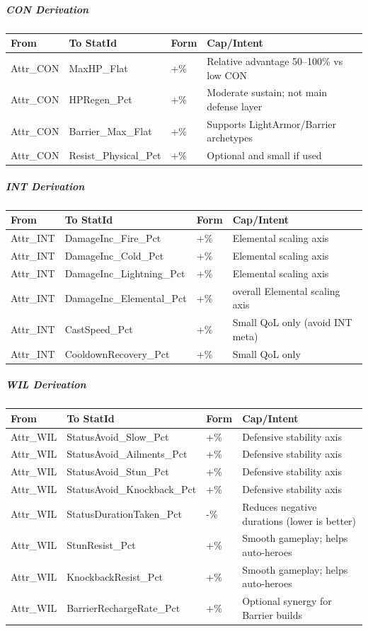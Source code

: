 \subparagraph{CON Derivation}
\begin{tabular}{l|l|l|l}
	\textbf{From} & \textbf{To StatId} & \textbf{Form} & \textbf{Cap/Intent} \\ \hline
	Attr\_CON & MaxHP\_Flat & +\% & Relative advantage 50--100\% vs low CON \\
	Attr\_CON & HPRegen\_Pct & +\% & Moderate sustain; not main defense layer \\
	Attr\_CON & Barrier\_Max\_Flat & +\% & Supports LightArmor/Barrier archetypes \\
	Attr\_CON & Resist\_Physical\_Pct & +\% & Optional and small if used \\
\end{tabular}

\subparagraph{INT Derivation}
\begin{tabular}{l|l|l|l}
	\textbf{From} & \textbf{To StatId} & \textbf{Form} & \textbf{Cap/Intent} \\ \hline
	Attr\_INT & DamageInc\_Fire\_Pct & +\% & Elemental scaling axis \\
	Attr\_INT & DamageInc\_Cold\_Pct & +\% & Elemental scaling axis \\
	Attr\_INT & DamageInc\_Lightning\_Pct & +\% & Elemental scaling axis \\
	Attr\_INT & DamageInc\_Elemental\_Pct & +\% & overall Elemental scaling axis \\
	Attr\_INT & CastSpeed\_Pct & +\% & Small QoL only (avoid INT meta) \\
	Attr\_INT & CooldownRecovery\_Pct & +\% & Small QoL only\\
\end{tabular}

\subparagraph{WIL Derivation}
\begin{tabular}{l|l|l|l}
	\textbf{From} & \textbf{To StatId} & \textbf{Form} & \textbf{Cap/Intent} \\ \hline
	Attr\_WIL & StatusAvoid\_Slow\_Pct & +\% & Defensive stability axis \\
	Attr\_WIL & StatusAvoid\_Ailments\_Pct & +\% & Defensive stability axis \\
	Attr\_WIL & StatusAvoid\_Stun\_Pct & +\% & Defensive stability axis \\
	Attr\_WIL & StatusAvoid\_Knockback\_Pct & +\% & Defensive stability axis \\
	Attr\_WIL & StatusDurationTaken\_Pct & -\% & Reduces negative durations (lower is better) \\
	Attr\_WIL & StunResist\_Pct & +\% & Smooth gameplay; helps auto-heroes \\
	Attr\_WIL & KnockbackResist\_Pct & +\% & Smooth gameplay; helps auto-heroes \\
	Attr\_WIL & BarrierRechargeRate\_Pct & +\% & Optional synergy for Barrier builds \\
\end{tabular}

